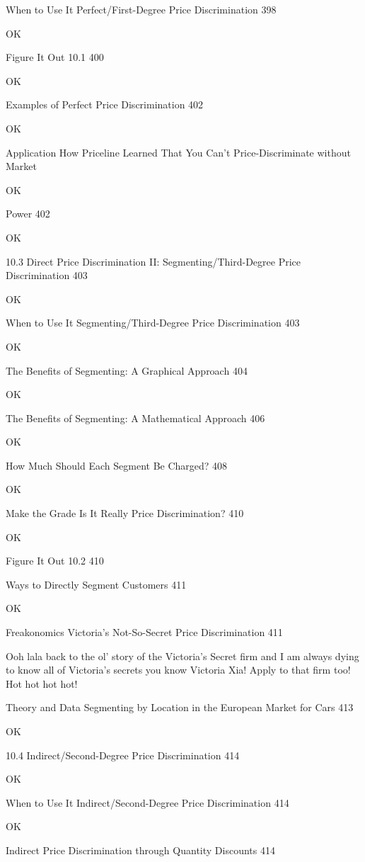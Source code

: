 When to Use It Perfect/First-Degree Price Discrimination 398

OK

Figure It Out 10.1 400

OK

Examples of Perfect Price Discrimination 402

OK

Application How Priceline Learned That You Can't Price-Discriminate without Market

OK

Power 402

OK

10.3 Direct Price Discrimination II: Segmenting/Third-Degree Price Discrimination 403

OK

When to Use It Segmenting/Third-Degree Price Discrimination 403

OK

The Benefits of Segmenting: A Graphical Approach 404

OK

The Benefits of Segmenting: A Mathematical Approach 406

OK

How Much Should Each Segment Be Charged? 408

OK

Make the Grade Is It Really Price Discrimination? 410

OK

Figure It Out 10.2 410



Ways to Directly Segment Customers 411

OK

Freakonomics Victoria's Not-So-Secret Price Discrimination 411

Ooh lala back to the ol' story of the Victoria's Secret firm and I am always dying to know all of Victoria's secrets you know Victoria Xia! Apply to that firm too! Hot hot hot hot!

Theory and Data Segmenting by Location in the European Market for Cars 413

OK

10.4 Indirect/Second-Degree Price Discrimination 414

OK

When to Use It Indirect/Second-Degree Price Discrimination 414

OK

Indirect Price Discrimination through Quantity Discounts 414



